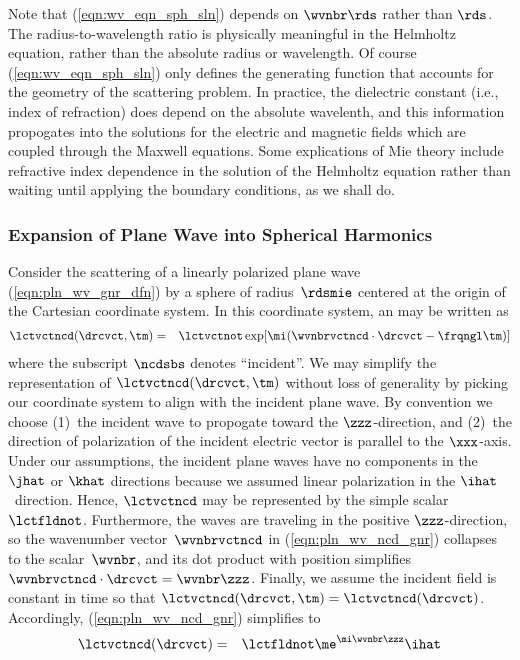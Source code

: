 \documentclass[12pt]{article}
\begin{document}
Note that (\ref{eqn:wv_eqn_sph_sln}) depends on $\wvnbr\rds$ rather 
than $\rds$. 
The radius-to-wavelength ratio is physically meaningful in the
Helmholtz equation, rather than the absolute radius or wavelength.
Of course (\ref{eqn:wv_eqn_sph_sln}) only defines the generating
function that accounts for the geometry of the scattering problem.  
In practice, the dielectric constant (i.e., index of refraction) does
depend on the absolute wavelenth, and this information propogates
into the solutions for the electric and magnetic fields which are 
coupled through the Maxwell equations.
Some explications of Mie theory \cite[e.g.,][p.~180]{Lio02} include
refractive index dependence in the solution of the Helmholtz equation
rather than waiting until applying the boundary conditions, as we
shall do.

\subsubsection[Plane Wave Expansion]{Expansion of Plane Wave into Spherical Harmonics}\label{sxn:xpn}
Consider the scattering of a linearly polarized plane wave
(\ref{eqn:pln_wv_gnr_dfn}) by a sphere of radius~$\rdsmie$ centered at
the origin of the Cartesian coordinate system.  
In this coordinate system, an 
may be written as 
\begin{eqnarray}
\lctvctncd(\drcvct,\tm) & = & 
\lctvctnot \exp[\mi (\wvnbrvctncd \cdot \drcvct - \frqngl \tm ) ]
\label{eqn:pln_wv_ncd_gnr}
\end{eqnarray}
where the subscript $\ncdsbs$ denotes ``incident''.
We may simplify the representation of $\lctvctncd(\drcvct,\tm)$
without loss of generality by picking our coordinate system to
align with the incident plane wave.
By convention we choose (1)~the incident wave to propogate toward the
$\zzz$-direction, and (2)~the direction of polarization of the
incident electric vector is parallel to the $\xxx$-axis.
Under our assumptions, the incident plane waves have no components
in the $\jhat$ or $\khat$ directions because we assumed linear
polarization in the $\ihat$~direction. 
Hence, $\lctvctncd$ may be represented by the simple
scalar~$\lctfldnot$.  
Furthermore, the waves are traveling in the positive $\zzz$-direction,
so the wavenumber vector~$\wvnbrvctncd$ in (\ref{eqn:pln_wv_ncd_gnr})
collapses to the scalar~$\wvnbr$, and its dot product with position
simplifies $\wvnbrvctncd \cdot \drcvct = \wvnbr\zzz$.
Finally, we assume the incident field is constant in time so that
$\lctvctncd(\drcvct,\tm) = \lctvctncd(\drcvct)$.
Accordingly, (\ref{eqn:pln_wv_ncd_gnr}) simplifies to
\begin{eqnarray}
\lctvctncd(\drcvct) & = & \lctfldnot \me^{\mi\wvnbr\zzz} \ihat
\label{eqn:wv_eqn_ncd}
\end{eqnarray}
\end{document}
